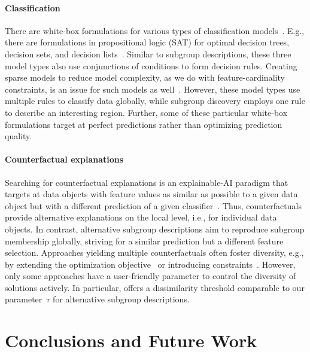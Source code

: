 \documentclass{article}
\theoremstyle{definition}
\begin{document}
\paragraph{Classification}

There are white-box formulations for various types of classification models~\cite{ignatiev2021reasoning}.
E.g., there are formulations in propositional logic (SAT) for optimal decision trees, decision sets, and decision lists~\cite{narodytska2018learning, shati2021sat, yu2021learning}.
Similar to subgroup descriptions, these three model types also use conjunctions of conditions to form decision rules.
Creating sparse models to reduce model complexity, as we do with feature-cardinality constraints, is an issue for such models as well~\cite{yu2021learning}.
However, these model types use multiple rules to classify data globally, while subgroup discovery employs one rule to describe an interesting region.
Further, some of these particular white-box formulations target at perfect predictions rather than optimizing prediction quality.

\paragraph{Counterfactual explanations}

Searching for counterfactual explanations is an explainable-AI paradigm that targets at data objects with feature values as similar as possible to a given data object but with a different prediction of a given classifier~\cite{guidotti2022counterfactual}.
Thus, counterfactuals provide alternative explanations on the local level, i.e., for individual data objects.
In contrast, alternative subgroup descriptions aim to reproduce subgroup membership globally, striving for a similar prediction but a different feature selection.
Approaches yielding multiple counterfactuals often foster diversity, e.g., by extending the optimization objective~\cite{mothilal2020explaining} or introducing constraints~\cite{karimi2020model, mohammadi2021scaling, russell2019efficient}.
However, only some approaches have a user-friendly parameter to control the diversity of solutions actively.
In particular, \cite{mohammadi2021scaling} offers a dissimilarity threshold comparable to our parameter~$\tau$ for alternative subgroup descriptions.

\section{Conclusions and Future Work}
\label{sec:csd:conclusion}
\end{document}
